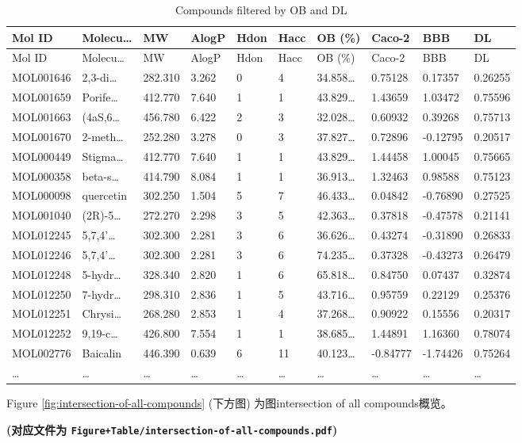 \documentclass[
]{article}
\begin{document}
\begin{longtable}[]{@{}llllllllll@{}}
\caption{\label{tab:Compounds-filtered-by-OB-and-DL}Compounds filtered by OB and DL}\tabularnewline
\toprule
Mol ID & Molecu\ldots{} & MW & AlogP & Hdon & Hacc & OB (\%) & Caco-2 & BBB & DL\tabularnewline
\midrule
\endfirsthead
\toprule
Mol ID & Molecu\ldots{} & MW & AlogP & Hdon & Hacc & OB (\%) & Caco-2 & BBB & DL\tabularnewline
\midrule
\endhead
MOL001646 & 2,3-di\ldots{} & 282.310 & 3.262 & 0 & 4 & 34.858\ldots{} & 0.75128 & 0.17357 & 0.26255\tabularnewline
MOL001659 & Porife\ldots{} & 412.770 & 7.640 & 1 & 1 & 43.829\ldots{} & 1.43659 & 1.03472 & 0.75596\tabularnewline
MOL001663 & (4aS,6\ldots{} & 456.780 & 6.422 & 2 & 3 & 32.028\ldots{} & 0.60932 & 0.39268 & 0.75713\tabularnewline
MOL001670 & 2-meth\ldots{} & 252.280 & 3.278 & 0 & 3 & 37.827\ldots{} & 0.72896 & -0.12795 & 0.20517\tabularnewline
MOL000449 & Stigma\ldots{} & 412.770 & 7.640 & 1 & 1 & 43.829\ldots{} & 1.44458 & 1.00045 & 0.75665\tabularnewline
MOL000358 & beta-s\ldots{} & 414.790 & 8.084 & 1 & 1 & 36.913\ldots{} & 1.32463 & 0.98588 & 0.75123\tabularnewline
MOL000098 & quercetin & 302.250 & 1.504 & 5 & 7 & 46.433\ldots{} & 0.04842 & -0.76890 & 0.27525\tabularnewline
MOL001040 & (2R)-5\ldots{} & 272.270 & 2.298 & 3 & 5 & 42.363\ldots{} & 0.37818 & -0.47578 & 0.21141\tabularnewline
MOL012245 & 5,7,4'\ldots{} & 302.300 & 2.281 & 3 & 6 & 36.626\ldots{} & 0.43274 & -0.31890 & 0.26833\tabularnewline
MOL012246 & 5,7,4'\ldots{} & 302.300 & 2.281 & 3 & 6 & 74.235\ldots{} & 0.37328 & -0.43273 & 0.26479\tabularnewline
MOL012248 & 5-hydr\ldots{} & 328.340 & 2.820 & 1 & 6 & 65.818\ldots{} & 0.84750 & 0.07437 & 0.32874\tabularnewline
MOL012250 & 7-hydr\ldots{} & 298.310 & 2.836 & 1 & 5 & 43.716\ldots{} & 0.95759 & 0.22129 & 0.25376\tabularnewline
MOL012251 & Chrysi\ldots{} & 268.280 & 2.853 & 1 & 4 & 37.268\ldots{} & 0.90922 & 0.15556 & 0.20317\tabularnewline
MOL012252 & 9,19-c\ldots{} & 426.800 & 7.554 & 1 & 1 & 38.685\ldots{} & 1.44891 & 1.16360 & 0.78074\tabularnewline
MOL002776 & Baicalin & 446.390 & 0.639 & 6 & 11 & 40.123\ldots{} & -0.84777 & -1.74426 & 0.75264\tabularnewline
\ldots{} & \ldots{} & \ldots{} & \ldots{} & \ldots{} & \ldots{} & \ldots{} & \ldots{} & \ldots{} & \ldots{}\tabularnewline
\bottomrule
\end{longtable}

Figure \ref{fig:intersection-of-all-compounds} (下方图) 为图intersection of all compounds概览。

\textbf{(对应文件为 \texttt{Figure+Table/intersection-of-all-compounds.pdf})}
\end{document}
